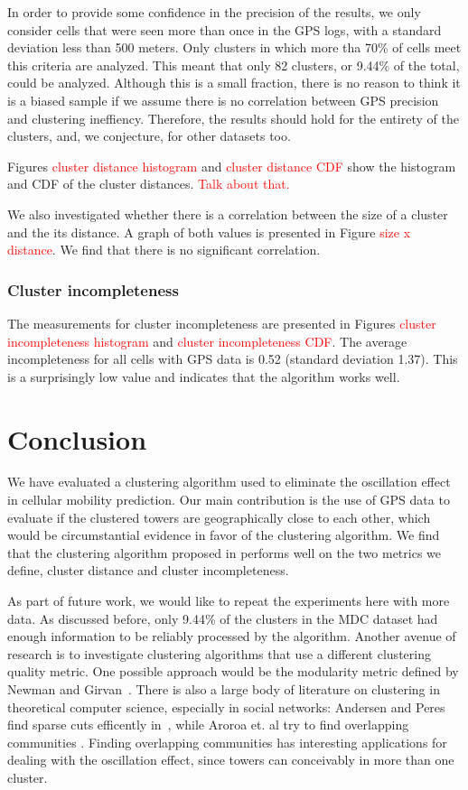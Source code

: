 \documentclass[letterpaper, 11pt, conference]{ieeeconf}
\newcommand{\xxx}[1]{\textcolor{red}{#1}}
\begin{document}
In order to provide some confidence in the precision of the results, we only consider cells that were seen more than once in the GPS logs, with a standard deviation less than 500 meters. Only clusters in which more tha 70\% of cells meet this criteria are analyzed. This meant that only 82 clusters, or 9.44\% of the total, could be analyzed. Although this is a small fraction, there is no reason to think it is a biased sample if we assume there is no correlation between GPS precision and clustering ineffiency. Therefore, the results should hold for the entirety of the clusters, and, we conjecture, for other datasets too.

Figures \xxx{cluster distance histogram} and \xxx{cluster distance CDF} show the histogram and CDF of the cluster distances. \xxx{Talk about that.}

We also investigated whether there is a correlation between the size of a cluster and the its distance. A graph of both values is presented in Figure \xxx{size x distance}. We find that there is no significant correlation.

\subsubsection{Cluster incompleteness}

The measurements for cluster incompleteness are presented in Figures \xxx{cluster incompleteness histogram} and \xxx{cluster incompleteness CDF}. The average incompleteness for all cells with GPS data is 0.52 (standard deviation 1.37). This is a surprisingly low value and indicates that the algorithm works well.

\section{Conclusion}
\label{sec:conclusion}
We have evaluated a clustering algorithm used to eliminate the oscillation effect in cellular mobility prediction. Our main contribution is the use of GPS data to evaluate if the clustered towers are geographically close to each other, which would be circumstantial evidence in favor of the clustering algorithm. We find that the clustering algorithm proposed in \cite{mobilityprofiler} performs well on the two metrics we define, cluster distance and cluster incompleteness.

As part of future work, we would like to repeat the experiments here with more data. As discussed before, only 9.44\% of the clusters in the MDC dataset had enough information to be reliably processed by the algorithm. Another avenue of research is to investigate clustering algorithms that use a different clustering quality metric. One possible approach would be the modularity metric defined by Newman and Girvan~\cite{newman}. There is also a large body of literature on clustering in theoretical computer science, especially in social networks: Andersen and Peres find sparse cuts efficently in~\cite{sparsecuts}, while Aroroa et. al try to find overlapping communities \cite{overlapping}. Finding overlapping communities has interesting applications for dealing with the oscillation effect, since towers can conceivably in more than one cluster.



\end{document}
